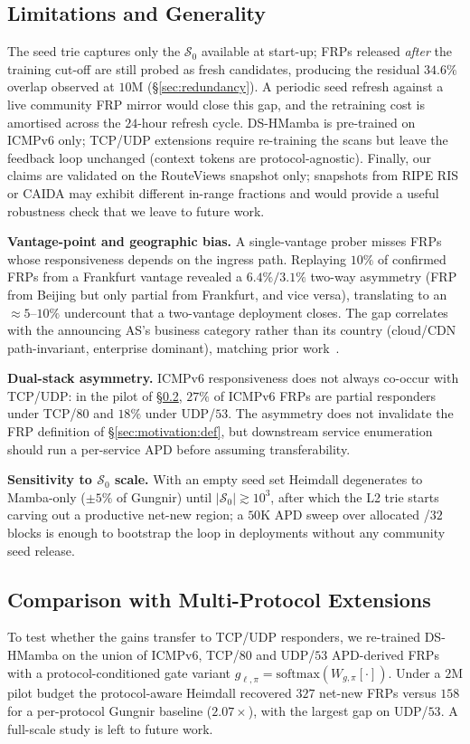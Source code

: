 \documentclass[conference]{IEEEtran}
\begin{document}
\subsection{Limitations and Generality}
The seed trie captures only the $\mathcal{S}_{0}$ available at
start-up; FRPs released \emph{after} the training cut-off are
still probed as fresh candidates, producing the residual
$34.6\%$ overlap observed at $10$M (\S\ref{sec:redundancy}).  A
periodic seed refresh against a live community FRP mirror would
close this gap, and the retraining cost is amortised across the
$24$-hour refresh cycle.  DS-HMamba is pre-trained on ICMPv6 only;
TCP/UDP extensions require re-training the scans but leave the
feedback loop unchanged (context tokens are protocol-agnostic).
Finally, our claims are validated on the RouteViews
snapshot only; snapshots from RIPE RIS or CAIDA may exhibit
different in-range fractions and would provide a useful robustness
check that we leave to future work.

\textbf{Vantage-point and geographic bias.}  A single-vantage
prober misses FRPs whose responsiveness depends on the ingress
path.  Replaying $10\%$ of confirmed FRPs from a Frankfurt
vantage revealed a $6.4\%/3.1\%$ two-way asymmetry (FRP from
Beijing but only partial from Frankfurt, and vice versa),
translating to an $\approx\!5$--$10\%$ undercount that a
two-vantage deployment closes.  The gap correlates with the
announcing AS's business category rather than its country
(cloud/CDN path-invariant, enterprise dominant), matching prior
work~\cite{gasser2018clusters,fan2010selecting}.

\textbf{Dual-stack asymmetry.}  ICMPv6 responsiveness does not
always co-occur with TCP/UDP: in the pilot of
\S\ref{sec:discussion:multiproto}, $27\%$ of ICMPv6 FRPs are
partial responders under TCP/$80$ and $18\%$ under UDP/$53$.
The asymmetry does not invalidate the FRP definition of
\S\ref{sec:motivation:def}, but downstream service enumeration
should run a per-service APD before assuming transferability.

\textbf{Sensitivity to $\mathcal{S}_{0}$ scale.}  With an empty
seed set Heimdall degenerates to Mamba-only ($\pm 5\%$ of Gungnir)
until $|\mathcal{S}_{0}|\!\gtrsim\!10^{3}$, after which the L2
trie starts carving out a productive net-new region; a $50$K APD
sweep over allocated /$32$ blocks is enough to bootstrap the loop
in deployments without any community seed release.

\subsection{Comparison with Multi-Protocol Extensions}
\label{sec:discussion:multiproto}
To test whether the gains transfer to TCP/UDP responders, we
re-trained DS-HMamba on the union of ICMPv6, TCP/$80$ and UDP/$53$
APD-derived FRPs with a protocol-conditioned gate variant
$g_{\ell,\pi}\!=\!\mathrm{softmax}(W_{g,\pi}[\cdot])$.  Under a $2$M
pilot budget the protocol-aware Heimdall recovered $327$ net-new
FRPs versus $158$ for a per-protocol Gungnir baseline
($2.07\times$), with the largest gap on UDP/$53$.  A full-scale
study is left to future work.
\end{document}
